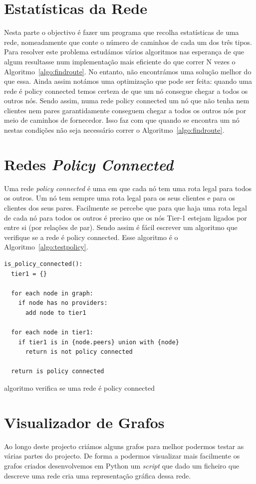 \documentclass[10pt,a4paper]{article}
\begin{document}
\section{Estatísticas da Rede}
Nesta parte o objectivo é fazer um programa que recolha estatísticas de uma rede, nomeadamente que conte o número de caminhos de cada um dos três tipos. Para resolver este problema estudámos vários algoritmos nas esperança de que algum resultasse num implementação mais eficiente do que correr N vezes o Algoritmo~\ref{algo:findroute}. No entanto, não encontrámos uma solução melhor do que essa. Ainda assim notámos uma optimização que pode ser feita: quando uma rede é policy connected temos certeza de que um nó consegue chegar a todos os outros nós. Sendo assim, numa rede policy connected um nó que não tenha nem clientes nem pares garantidamente conseguem chegar a todos os outros nós por meio de caminhos de fornecedor. Isso faz com que quando se encontra um nó nestas condições não seja necessário correr o Algoritmo~\ref{algo:findroute}.



\section{Redes \textit{Policy Connected}}
Uma rede \textit{policy connected} é uma em que cada nó tem uma rota legal para todos os outros. Um nó tem sempre uma rota legal para os seus clientes e para os clientes dos seus pares. Facilmente se percebe que para que haja uma rota legal de cada nó para todos os outros é preciso que os nós Tier-1 estejam ligados por entre si (por relações de par). Sendo assim é fácil escrever um algoritmo que verifique se a rede é policy connected. Esse algoritmo é o Algoritmo~\ref{algo:testpolicy}.

\begin{algorithm}
\begin{lstlisting}
is_policy_connected():
  tier1 = {}

  for each node in graph:
    if node has no providers:
      add node to tier1

  for each node in tier1:
    if tier1 is in {node.peers} union with {node}
      return is not policy connected

  return is policy connected
\end{lstlisting}
\caption{algoritmo verifica se uma rede é policy connected}
\label{algo:testpolicy}
\end{algorithm}


\section{Visualizador de Grafos}
Ao longo deste projecto criámos alguns grafos para melhor podermos testar as várias partes do projecto. De forma a podermos visualizar mais facilmente os grafos criados desenvolvemos em Python um \textit{script} que dado um ficheiro que descreve uma rede cria uma representação gráfica dessa rede.
\end{document}
